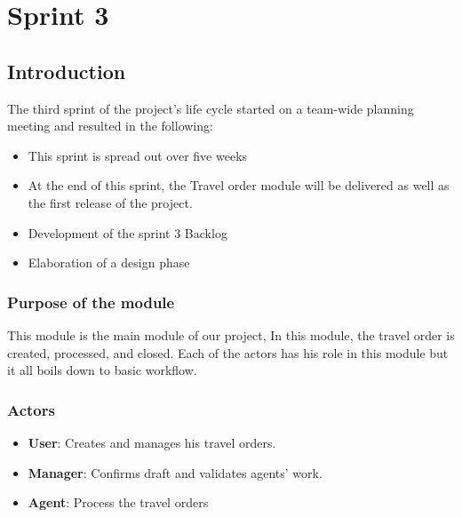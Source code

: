 \chapter{Sprint 3}
	
\section*{Introduction}
    The third sprint of the project's life cycle started on a team-wide planning meeting and resulted in the following:
    \begin{itemize}
        \item This sprint is spread out over five weeks
        \item  At the end of this sprint, the Travel order module will be delivered as well as the first release of the project. 
        \item Development of the sprint 3 Backlog
        \item Elaboration of a design phase
    \end{itemize}
\subsection*{Purpose of the module}
This module is the main module of our project, In this module, the travel order is created, processed, and closed. Each of the actors has his role in this module but it all boils down to basic workflow.
\subsection*{Actors}
\begin{itemize}
\item \textbf{User}: Creates and manages his travel orders.
\item \textbf{Manager}: Confirms draft and validates agents' work.
\item \textbf{Agent}: Process the travel orders
\end{itemize}
